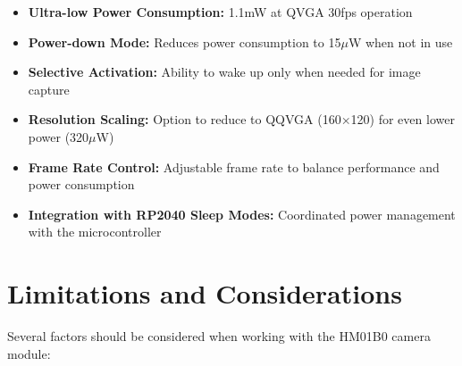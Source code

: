\begin{itemize}
    
    
    
    \item \textbf{Ultra-low Power Consumption:} 1.1mW at QVGA 30fps operation
    
    
    
    \item \textbf{Power-down Mode:} Reduces power consumption to 15$\mu$W when not in use
    
    
    
    \item \textbf{Selective Activation:} Ability to wake up only when needed for image capture
    
    
    
    \item \textbf{Resolution Scaling:} Option to reduce to QQVGA (160×120) for even lower power (320$\mu$W)
    
    
    
    \item \textbf{Frame Rate Control:} Adjustable frame rate to balance performance and power consumption
    
    
    
    \item \textbf{Integration with RP2040 Sleep Modes:} Coordinated power management with the microcontroller
    
    
    
\end{itemize}







\section{Limitations and Considerations}



Several factors should be considered when working with the HM01B0 camera module:



